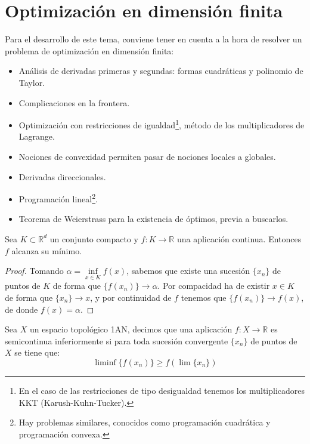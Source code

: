 \chapter{Optimización en dimensión finita}

\noindent
Para el desarrollo de este tema, conviene tener en cuenta a la hora de resolver un problema de optimización en dimensión finita: %
\begin{itemize}
    \item Análisis de derivadas primeras y segundas: formas cuadráticas y polinomio de Taylor.
    \item Complicaciones en la frontera.
    \item Optimización con restricciones de igualdad\footnote{En el caso de las restricciones de tipo desigualdad tenemos los multiplicadores KKT (Karush-Kuhn-Tucker).}, método de los multiplicadores de Lagrange.
    \item Nociones de convexidad permiten pasar de nociones locales a globales.
    \item Derivadas direccionales.
    \item Programación lineal\footnote{Hay problemas similares, conocidos como programación cuadrática y programación convexa.}.
    \item Teorema de Weierstrass para la existencia de óptimos, previa a buscarlos.
\end{itemize}

\begin{teo}[de Weierstrass]
    Sea $K\subset \mathbb{R}^d$ un conjunto compacto y $f:K\to \mathbb{R}$ una aplicación continua. Entonces $f$ alcanza su mínimo.
    \begin{proof}
        Tomando $\alpha = \inf\limits_{x\in K}f(x)$, sabemos que existe una sucesión $\{x_n\}$ de puntos de $K$ de forma que $\{f(x_n)\}\to \alpha$. Por compacidad ha de existir $x\in K$ de forma que $\{x_n\}\to x$, y por continuidad de $f$ tenemos que $\{f(x_n)\}\to f(x)$, de donde $f(x) = \alpha$.
    \end{proof}
\end{teo}

\begin{definicion}
    Sea $X$ un espacio topológico 1AN, decimos que una aplicación $f:X\to \mathbb{R}$ es semicontinua inferiormente si para toda sucesión convergente $\{x_n\}$ de puntos de $X$ se tiene que:
    \begin{equation*}
        \liminf \{f(x_n)\} \geq f\left(\lim \{x_n\}\right)
    \end{equation*}
\end{definicion}

